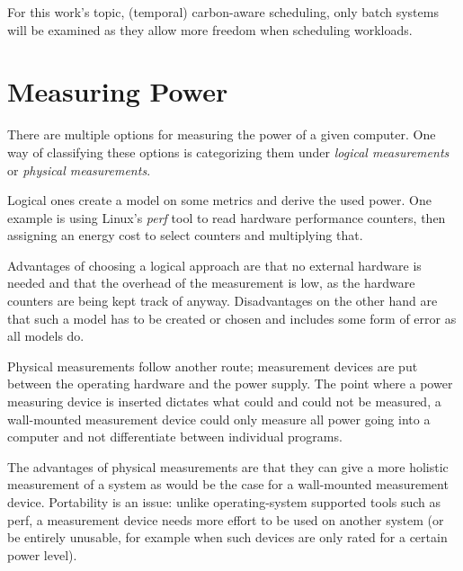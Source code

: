 For this work's topic, (temporal) carbon-aware scheduling, only batch systems will be examined as they allow more freedom when scheduling workloads.

\section{Measuring Power}

There are multiple options for measuring the power of a given computer. One way of classifying these options is categorizing them under \emph{logical measurements} or \emph{physical measurements}.

Logical ones create a model on some metrics and derive the used power. One example is using Linux's \emph{perf} tool to read hardware performance counters, then assigning an energy cost to select counters and multiplying that. 

Advantages of choosing a logical approach are that no external hardware is needed and that the overhead of the measurement is low, as the hardware counters are being kept track of anyway. 
Disadvantages on the other hand are that such a model has to be created or chosen and includes some form of error as all models do.

Physical measurements follow another route; measurement devices are put between the operating hardware and the power supply. 
The point where a power measuring device is inserted dictates what could and could not be measured, a wall-mounted measurement device could only measure all power going into a computer and not differentiate between individual programs.

The advantages of physical measurements are that they can give a more holistic measurement of a system as would be the case for a wall-mounted measurement device. 
Portability is an issue: unlike operating-system supported tools such as perf, a measurement device needs more effort to be used on another system (or be entirely unusable, for example when such devices are only rated for a certain power level).


